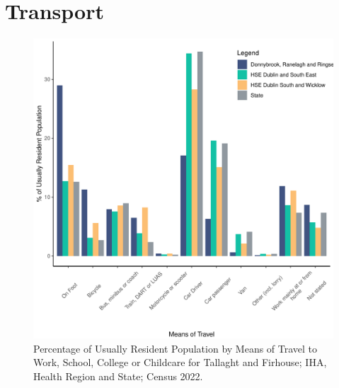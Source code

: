 \documentclass{article}
\begin{document}
\section{Transport}\label{sect:Trans}
\begin{figure}[H]
	\centering
	\includegraphics[width = 120mm]{../figures/TravelED.pdf}
	\caption{Percentage of Usually Resident Population by Means of Travel to Work, School, College or Childcare for Tallaght and Firhouse; IHA, Health Region and State; Census 2022.}
	\label{fig:vbnv}
	\end{figure}
\end{document}
